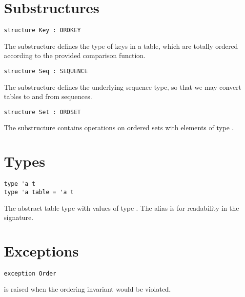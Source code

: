 \section{Substructures}

\begin{gram}
\begin{verbatim}
structure Key : ORDKEY
\end{verbatim}
The  substructure defines the type of keys in a table, which are
totally ordered according to the provided comparison function.
\end{gram}

\begin{gram}
\begin{verbatim}
structure Seq : SEQUENCE
\end{verbatim}
The  substructure defines the underlying sequence type, so that we
may convert tables to and from sequences.
\end{gram}

\begin{gram}
\begin{verbatim}
structure Set : ORDSET
\end{verbatim}
The  substructure contains operations on ordered sets with elements of
type .
\end{gram}


\section{Types}

\begin{gram}
\begin{verbatim}
type 'a t
type 'a table = 'a t
\end{verbatim}
The abstract table type with values of type . The alias  is
for readability in the signature.
\end{gram}


\section{Exceptions}

\begin{gram}
\begin{verbatim}
exception Order
\end{verbatim}
 is raised when the ordering invariant would be violated.
\end{gram}


